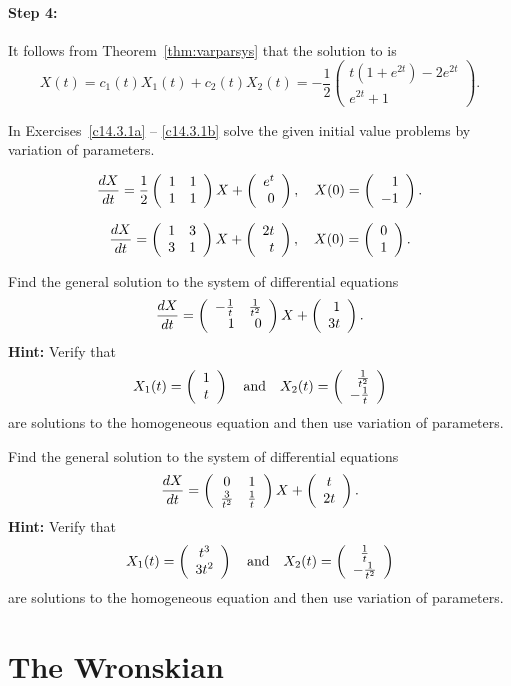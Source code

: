 \documentclass{ximera}
\begin{document}
\paragraph{Step 4:}  It follows from Theorem~\ref{thm:varparsys} that the 
solution to  is
\[
X(t) = c_1(t)X_1(t) + c_2(t)X_2(t) = -\frac{1}{2}\left(\begin{array}{c}
t(1+e^{2t})-2e^{2t} \\ e^{2t}+1 \end{array}\right).
\]
 


\EXER

\TEXER

\noindent In Exercises~\ref{c14.3.1a} -- \ref{c14.3.1b} solve the given 
initial value problems by variation of parameters.

\begin{exercise}  \label{c14.3.1a}
\[
\frac{dX}{dt}=\frac{1}{2}\left(\begin{array}{rr} 1 & 1\\ 1 &1\end{array}\right) X + \left(\begin{array}{r} e^t \\ 0\end{array}\right),\quad
X(0) = \left(\begin{array}{r} 1 \\ -1\end{array}\right).
\]
\end{exercise}
\begin{exercise}  \label{c14.3.1b}
\[
\frac{dX}{dt}=\left(\begin{array}{rr} 1 & 3\\ 3 &1\end{array}\right) X + \left(\begin{array}{r} 2t \\ t\end{array}\right),\quad
X(0) = \left(\begin{array}{r} 0 \\ 1\end{array}\right).
\]
\end{exercise}

\begin{exercise}  \label{c17.3.3}
Find the general solution to the system of differential equations
\[
\frac{dX}{dt}= \left(\begin{array}{rr} -\frac{1}{t} & \frac{1}{t^2}\\ 1 &0\end{array}\right)X+\left(\begin{array}{r} 1 \\ 3t\end{array}\right).
\]
{\bf Hint:} Verify that 
\[
X_1(t) = \left(\begin{array}{c} 1 \\ t\end{array}\right) \quad\mbox{and}\quad X_2(t) = \left(\begin{array}{r} \frac{1}{t^2} \\ -\frac{1}{t}\end{array}\right)
\]
are solutions to the homogeneous equation and then use variation of parameters.
\end{exercise}

\begin{exercise}  \label{c17.3.4}
Find the general solution to the system of differential equations
\[
\frac{dX}{dt}= \left(\begin{array}{cc} 0 & 1\\ \frac{3}{t^2} &\frac{1}{t}\end{array}\right)X+\left(\begin{array}{c} t \\ 2t\end{array}\right).
\]
{\bf Hint:} Verify that 
\[
X_1(t) = \left(\begin{array}{c} t^3 \\ 3t^2\end{array}\right)\quad\mbox{and}\quad X_2(t) = \left(\begin{array}{c} \frac{1}{t} \\ -\frac{1}{t^2}\end{array}\right)
\]
are solutions to the homogeneous equation and then use variation of parameters.
\end{exercise}






\section{The Wronskian}  \label{S:wronskian}
\end{document}
